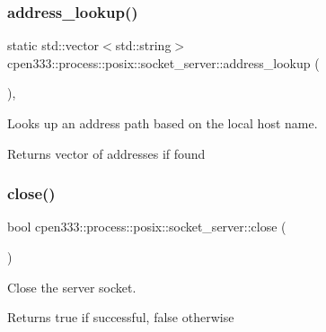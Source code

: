\subsubsection{\texorpdfstring{address\+\_\+lookup()}{address\_lookup()}}
{\footnotesize\ttfamily static std\+::vector$<$std\+::string$>$ cpen333\+::process\+::posix\+::socket\+\_\+server\+::address\+\_\+lookup (\begin{DoxyParamCaption}{ }\end{DoxyParamCaption})\hspace{0.3cm}{\ttfamily [inline]}, {\ttfamily [static]}}



Looks up an address path based on the local host name. 

\begin{DoxyReturn}{Returns}
vector of addresses if found 
\end{DoxyReturn}
\mbox{\label{classcpen333_1_1process_1_1posix_1_1socket__server_a306aea15eb1c856f269b1c3727fbfa17}} 
\subsubsection{\texorpdfstring{close()}{close()}}
{\footnotesize\ttfamily bool cpen333\+::process\+::posix\+::socket\+\_\+server\+::close (\begin{DoxyParamCaption}{ }\end{DoxyParamCaption})\hspace{0.3cm}{\ttfamily [inline]}}



Close the server socket. 

\begin{DoxyReturn}{Returns}
true if successful, false otherwise 
\end{DoxyReturn}
\mbox{\label{classcpen333_1_1process_1_1posix_1_1socket__server_a5962af3110c19660b29f154f867e87e2}} 
